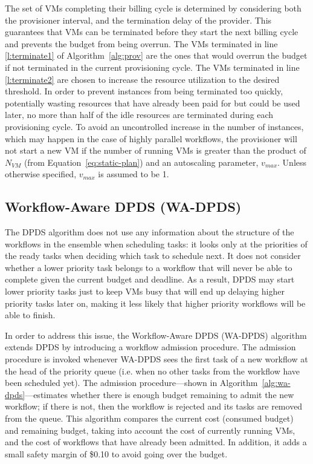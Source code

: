 \documentclass[conference]{IEEEtran}
\begin{document}
The set of VMs completing their billing cycle is determined by considering both the provisioner interval, and the termination delay of the provider. This guarantees that VMs can be terminated before they start the next billing cycle and prevents the budget from being overrun. The VMs terminated in line \ref{l:terminate1} of Algorithm~\ref{alg:prov} are the ones that would overrun the budget if not terminated in the current provisioning cycle. The VMs terminated in line \ref{l:terminate2} are chosen to increase the resource utilization to the desired threshold. In order to prevent instances from being terminated too quickly, potentially wasting resources that have already been paid for but could be used later, no more than half of the idle resources are terminated during each provisioning cycle. To avoid an uncontrolled increase in the number of instances, which may happen in the case of highly parallel workflows, the provisioner will not start a new VM if the number of running VMs is greater than the product of $N_{VM}$ (from Equation~\ref{eq:static-plan}) and an autoscaling parameter, $v_{max}$. Unless otherwise specified, $v_{max}$ is assumed to be 1.


\subsection{Workflow-Aware DPDS (WA-DPDS)}

The DPDS algorithm does not use any information about the structure of the workflows in the ensemble when scheduling tasks: it looks only at the priorities of the ready tasks when deciding which task to schedule next. It does not consider whether a lower priority task belongs to a workflow that will never be able to complete given the current budget and deadline. As a result, DPDS may start lower priority tasks just to keep VMs busy that will end up delaying higher priority tasks later on, making it less likely that higher priority workflows will be able to finish.

In order to address this issue, the Workflow-Aware DPDS (WA-DPDS) algorithm extends DPDS by introducing a workflow admission procedure. The admission procedure is invoked whenever WA-DPDS sees the first task of a new workflow at the head of the priority queue (i.e. when no other tasks from the workflow have been scheduled yet). The admission procedure---shown in Algorithm~\ref{alg:wa-dpds}---estimates whether there is enough budget remaining to admit the new workflow; if there is not, then the workflow is rejected and its tasks are removed from the queue. This algorithm compares the current cost (consumed budget) and remaining budget, taking into account the cost of currently running VMs, and the cost of workflows that have already been admitted. In addition, it adds a small safety margin of \$0.10 to avoid going over the budget.
\end{document}
